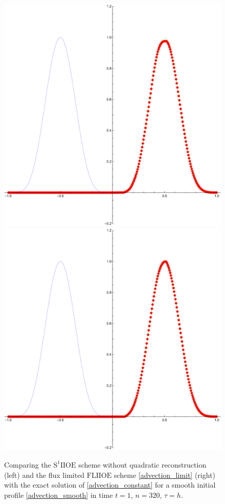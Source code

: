 \documentclass[../include.tex]{subfiles}
\begin{document}
\begin{figure}[H]
	\centering
	\includegraphics[width=.49\textwidth]{figures/smooth(S1IIOE)_320_h}
	\includegraphics[width=.49\textwidth]{figures/hump_320_h}
	\caption{Comparing the $\mathrm{S^1 IIOE}$ scheme without quadratic reconstruction (left) and the flux limited $\mathrm{FLIIOE}$ scheme \eqref{advection_limit} (right) with the exact solution of \eqref{advection_constant} for a smooth initial profile \eqref{advection_smooth} in time $ t=1 $, $ n=320 $, $ \tau=h $.}
	\label{fig:compare_S1FL_hump}
\end{figure}
\end{document}
